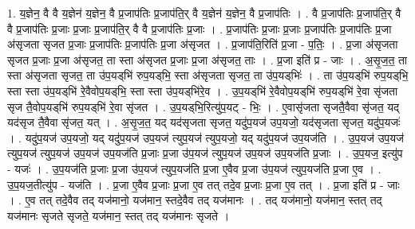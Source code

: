 \documentclass[17pt]{extarticle}
\begin{document}
1. य॒ज्ञेन॒ वै वै य॒ज्ञेन॑ य॒ज्ञेन॒ वै प्र॒जाप॑तिः प्र॒जाप॑ति॒र् वै य॒ज्ञेन॑ य॒ज्ञेन॒ वै प्र॒जाप॑तिः । . वै प्र॒जाप॑तिः प्र॒जाप॑ति॒र् वै वै प्र॒जाप॑तिः प्र॒जाः प्र॒जाः प्र॒जाप॑ति॒र् वै वै प्र॒जाप॑तिः प्र॒जाः । . प्र॒जाप॑तिः प्र॒जाः प्र॒जाः प्र॒जाप॑तिः प्र॒जाप॑तिः प्र॒जा अ॑सृजता सृजत प्र॒जाः प्र॒जाप॑तिः प्र॒जाप॑तिः प्र॒जा अ॑सृजत । . प्र॒जाप॑ति॒रिति॑ प्र॒जा - प॒तिः॒ । . प्र॒जा अ॑सृजता सृजत प्र॒जाः प्र॒जा अ॑सृजत॒ ता स्ता अ॑सृजत प्र॒जाः प्र॒जा अ॑सृजत॒ ताः । . प्र॒जा इति॑ प्र - जाः । . अ॒सृ॒ज॒त॒ ता स्ता अ॑सृजता सृजत॒ ता उ॑प॒यड्‌भि॑ रुप॒यड्‌भि॒ स्ता अ॑सृजता सृजत॒ ता उ॑प॒यड्‌भिः॑ । . ता उ॑प॒यड्‌भि॑ रुप॒यड्‌भि॒ स्ता स्ता उ॑प॒यड्‌भि॑ रे॒वैवोप॒यड्‌भि॒ स्ता स्ता उ॑प॒यड्‌भि॑रे॒व । . उ॒प॒यड्‌भि॑ रे॒वैवोप॒यड्‌भि॑ रुप॒यड्‌भि॑ रे॒वा सृ॑जता सृज तै॒वोप॒यड्‌भि॑ रुप॒यड्‌भि॑ रे॒वा सृ॑जत । . उ॒प॒यड्‌भि॒रित्यु॑प॒यट् - भिः॒ । . ए॒वासृ॑जता सृजतै॒वैवा सृ॑जत॒ यद् यद॑सृज तै॒वैवा सृ॑जत॒ यत् । . अ॒सृ॒ज॒त॒ यद् यद॑सृजता सृजत॒ यदु॑प॒यज॑ उप॒यजो॒ यद॑सृजता सृजत॒ यदु॑प॒यजः॑ । . यदु॑प॒यज॑ उप॒यजो॒ यद् यदु॑प॒यज॑ उप॒यज॑ त्युप॒यज॑ त्युप॒यजो॒ यद् यदु॑प॒यज॑ उप॒यज॑ति । . उ॒प॒यज॑ उप॒यज॑ त्युप॒यज॑ त्युप॒यज॑ उप॒यज॑ उप॒यज॑ति प्र॒जाः प्र॒जा उ॑प॒यज॑ त्युप॒यज॑ उप॒यज॑ उप॒यज॑ति प्र॒जाः । . उ॒प॒यज॒ इत्यु॑प - यजः॑ । . उ॒प॒यज॑ति प्र॒जाः प्र॒जा उ॑प॒यज॑ त्युप॒यज॑ति प्र॒जा ए॒वैव प्र॒जा उ॑प॒यज॑ त्युप॒यज॑ति प्र॒जा ए॒व । . उ॒प॒यज॒तीत्यु॑प - यज॑ति । . प्र॒जा ए॒वैव प्र॒जाः प्र॒जा ए॒व तत् तदे॒व प्र॒जाः प्र॒जा ए॒व तत् । . प्र॒जा इति॑ प्र - जाः । . ए॒व तत् तदे॒वैव तद् यज॑मानो॒ यज॑मान॒ स्तदे॒वैव तद् यज॑मानः । . तद् यज॑मानो॒ यज॑मान॒ स्तत् तद् यज॑मानः सृजते सृजते॒ यज॑मान॒ स्तत् तद् यज॑मानः सृजते । \newline
\end{document}
